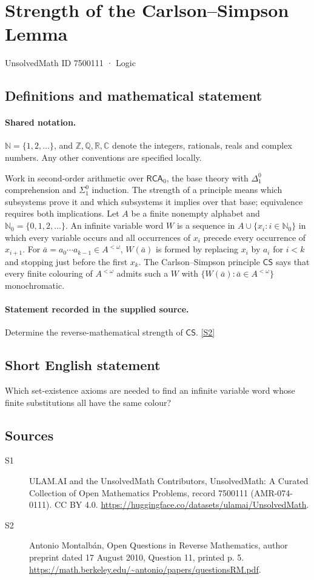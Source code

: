 \documentclass[11pt]{article}
\newcommand{\sref}[2]{\hyperlink{source:#1:#2}{[S#2]}}
\begin{document}
\setcounter{section}{7500110}
\section{Strength of the Carlson–Simpson Lemma}\label{7500111}
{\small\sffamily UnsolvedMath ID 7500111 · Logic}
\subsection{Definitions and mathematical statement}

\paragraph{Shared notation.}$\mathbb N=\{1,2,\ldots\}$, and $\mathbb Z,\mathbb Q,\mathbb R,\mathbb C$ denote the integers, rationals, reals and complex numbers. Any other conventions are specified locally.


Work in second-order arithmetic over $\mathsf{RCA}_0$, the base theory with $\Delta^0_1$ comprehension and $\Sigma^0_1$ induction. The strength of a principle means which subsystems prove it and which subsystems it implies over that base; equivalence requires both implications. Let $A$ be a finite nonempty alphabet and $\mathbb N_0=\{0,1,2,\ldots\}$. An infinite variable word $W$ is a sequence in $A\cup\{x_i:i\in\mathbb N_0\}$ in which every variable occurs and all occurrences of $x_i$ precede every occurrence of $x_{i+1}$. For $\bar a=a_0\cdots a_{k-1}\in A^{<\omega}$, $W(\bar a)$ is formed by replacing $x_i$ by $a_i$ for $i<k$ and stopping just before the first $x_k$. The Carlson--Simpson principle $\mathsf{CS}$ says that every finite colouring of $A^{<\omega}$ admits such a $W$ with $\{W(\bar a):\bar a\in A^{<\omega}\}$ monochromatic.
\paragraph{Statement recorded in the supplied source.}
Determine the reverse-mathematical strength of $\mathsf{CS}$. \sref{7500111}{2}
\subsection{Short English statement}
Which set-existence axioms are needed to find an infinite variable word whose finite substitutions all have the same colour?
\subsection{Sources}
\begin{description}
\item[\hypertarget{source:7500111:1}{S1}] ULAM.AI and the UnsolvedMath Contributors, UnsolvedMath: A Curated Collection of Open Mathematics Problems, record 7500111 (AMR-074-0111). CC BY 4.0. \url{https://huggingface.co/datasets/ulamai/UnsolvedMath}.
\item[\hypertarget{source:7500111:2}{S2}] Antonio Montalbán, Open Questions in Reverse Mathematics, author preprint dated 17 August 2010, Question 11, printed p. 5. \url{https://math.berkeley.edu/~antonio/papers/questionsRM.pdf}.
\end{description}
\label{end:7500111}
\end{document}

